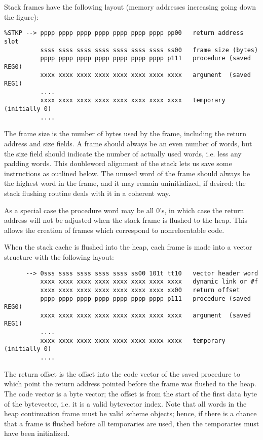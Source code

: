 Stack frames have the following layout (memory addresses increasing
going down the figure):

\begin{verbatim}
%STKP --> pppp pppp pppp pppp pppp pppp pppp pp00   return address slot
          ssss ssss ssss ssss ssss ssss ssss ss00   frame size (bytes)
          pppp pppp pppp pppp pppp pppp pppp p111   procedure (saved REG0)
          xxxx xxxx xxxx xxxx xxxx xxxx xxxx xxxx   argument  (saved REG1)
          ....
          xxxx xxxx xxxx xxxx xxxx xxxx xxxx xxxx   temporary (initially 0)
          ....
\end{verbatim}

The frame size is the number of bytes used by the frame, including the
return address and size fields.  A frame should always be an even
number of words, but the size field should indicate the number of
actually used words, i.e. less any padding words. This doubleword
alignment of the stack lets us save some instructions as outlined
below. The unused word of the frame should always be the highest word
in the frame, and it may remain uninitialized, if desired: the stack
flushing routine deals with it in a coherent way.

As a special case the procedure word may be all 0's, in which case the
return address will not be adjusted when the stack frame is flushed to
the heap. This allows the creation of frames which correspond to
nonrelocatable code.

When the stack cache is flushed into the heap, each frame is made into
a vector structure with the following layout:

\begin{verbatim}
      --> 0sss ssss ssss ssss ssss ss00 101t tt10   vector header word
          xxxx xxxx xxxx xxxx xxxx xxxx xxxx xxxx   dynamic link or #f
          xxxx xxxx xxxx xxxx xxxx xxxx xxxx xx00   return offset
          pppp pppp pppp pppp pppp pppp pppp p111   procedure (saved REG0)
          xxxx xxxx xxxx xxxx xxxx xxxx xxxx xxxx   argument  (saved REG1)
          ....
          xxxx xxxx xxxx xxxx xxxx xxxx xxxx xxxx   temporary (initially 0)
          ....
\end{verbatim}

The return offset is the offset into the code vector of the saved
procedure to which point the return address pointed before the frame
was flushed to the heap. The code vector is a byte vector; the offset
is from the start of the first data byte of the bytevector, i.e. it is
a valid bytevector index.  Note that all words in the heap
continuation frame must be valid scheme objects; hence, if there is a
chance that a frame is flushed before all temporaries are used, then
the temporaries must have been initialized.

